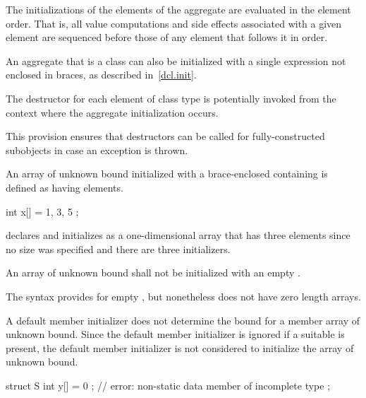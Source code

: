 \pnum
The initializations of the elements of the aggregate
are evaluated in the element order.
That is,
all value computations and side effects associated with a given element
are sequenced before
those of any element that follows it in order.

\pnum
An aggregate that is a class can also be initialized with a single
expression not enclosed in braces, as described in~\ref{dcl.init}.

\pnum
The destructor for each element of class type
is potentially invoked
from the context where the aggregate initialization occurs.
\begin{note}
This provision ensures that destructors can be called
for fully-constructed subobjects
in case an exception is thrown.
\end{note}

\pnum
An array of unknown bound initialized with a
brace-enclosed
containing
is defined as having
elements.
\begin{example}
\begin{codeblock}
int x[] = { 1, 3, 5 };
\end{codeblock}
declares and initializes
as a one-dimensional array that has three elements
since no size was specified and there are three initializers.
\end{example}
An array of unknown bound shall not be initialized with
an empty  \tcode{\{\}}.
\begin{footnote}
The syntax provides for empty ,
but nonetheless \Cpp{} does not have zero length arrays.
\end{footnote}
\begin{note}
A default member initializer does not determine the bound for a member
array of unknown bound.  Since the default member initializer is
ignored if a suitable  is present,
the default member initializer is not
considered to initialize the array of unknown bound.
\begin{example}
\begin{codeblock}
struct S {
  int y[] = { 0 };          // error: non-static data member of incomplete type
};
\end{codeblock}
\end{example}
\end{note}

